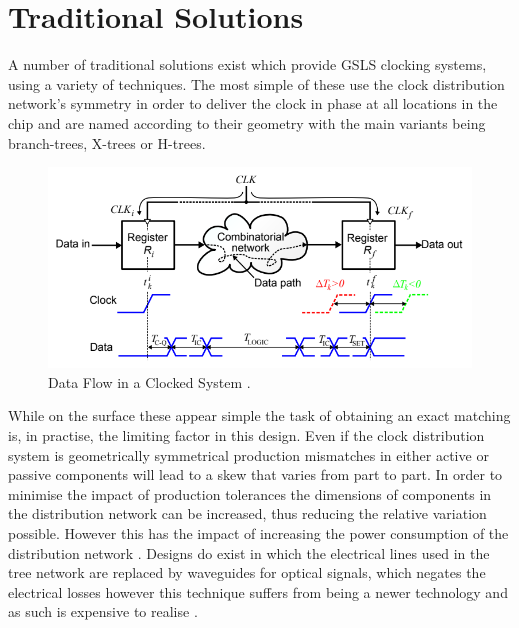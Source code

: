 \documentclass[11pt,english,british]{report}
\begin{document}
\section{Traditional Solutions}
A number of traditional solutions exist which provide GSLS clocking systems, using a variety of techniques. The most simple of these use the clock distribution network's symmetry in order to deliver the clock in phase at all locations in the chip and are named according to their geometry with the main variants being branch-trees, X-trees or H-trees. %
\begin{figure}[h]
	\centering
	\includegraphics[scale=0.5]{../eldar_why_precise_clocking}
	\caption{Data Flow in a Clocked System \cite{zianbetov2013distributed}.}%
	\label{fig:trees}
\end{figure}
While on the surface these appear simple the task of obtaining an exact matching is, in practise, the limiting factor in this design. Even if the clock distribution system is geometrically symmetrical production mismatches in either active or passive components will lead to a skew that varies from part to part. In order to minimise the impact of production tolerances the dimensions of components in the distribution network can be increased, thus reducing the relative variation possible. However this has the impact of increasing the power consumption of the distribution network \cite{tiwari1998reducing}.
Designs do exist in which the electrical lines used in the tree network are replaced by waveguides for optical signals, which negates the electrical losses however this technique suffers from being a newer technology and as such is expensive to realise \cite{haurylau2006chip}.
\end{document}
